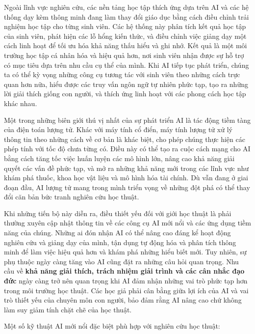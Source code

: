 Ngoài lĩnh vực nghiên cứu, các nền tảng học tập thích ứng dựa trên AI và các hệ thống dạy kèm thông minh đang làm thay đổi giáo dục bằng cách điều chỉnh trải nghiệm học tập cho từng sinh viên. Các hệ thống này phân tích kết quả học tập của sinh viên, phát hiện các lỗ hổng kiến thức, và điều chỉnh việc giảng dạy một cách linh hoạt để tối ưu hóa khả năng thấu hiểu và ghi nhớ. Kết quả là một môi trường học tập cá nhân hóa và hiệu quả hơn, nơi sinh viên nhận được sự hỗ trợ có mục tiêu dựa trên nhu cầu cụ thể của mình. Khi AI tiếp tục phát triển, chúng ta có thể kỳ vọng những công cụ tương tác với sinh viên theo những cách trực quan hơn nữa, hiểu được các truy vấn ngôn ngữ tự nhiên phức tạp, tạo ra những lời giải thích giống con người, và thích ứng linh hoạt với các phong cách học tập khác nhau.

Một trong những biên giới thú vị nhất của sự phát triển AI là tác động tiềm tàng của điện toán lượng tử. Khác với máy tính cổ điển, máy tính lượng tử xử lý thông tin theo những cách về cơ bản là khác biệt, cho phép chúng thực hiện các phép tính với tốc độ chưa từng có. Điều này có thể tạo ra cuộc cách mạng cho AI bằng cách tăng tốc việc huấn luyện các mô hình lớn, nâng cao khả năng giải quyết các vấn đề phức tạp, và mở ra những khả năng mới trong các lĩnh vực như khám phá thuốc, khoa học vật liệu và mô hình hóa tài chính. Dù vẫn đang ở giai đoạn đầu, AI lượng tử mang trong mình triển vọng về những đột phá có thể thay đổi căn bản bức tranh nghiên cứu học thuật.

Khi những tiến bộ này diễn ra, điều thiết yếu đối với giới học thuật là phải thường xuyên cập nhật thông tin về các công cụ AI mới nổi và các ứng dụng tiềm năng của chúng. Những ai đón nhận AI có thể nâng cao đáng kể hoạt động nghiên cứu và giảng dạy của mình, tận dụng tự động hóa và phân tích thông minh để làm việc hiệu quả hơn và khám phá những hiểu biết mới. Tuy nhiên, sự phụ thuộc ngày càng tăng vào AI cũng đặt ra những câu hỏi quan trọng. Nhu cầu về \textbf{khả năng giải thích, trách nhiệm giải trình và các cân nhắc đạo đức} ngày càng trở nên quan trọng khi AI đảm nhận những vai trò phức tạp hơn trong môi trường học thuật. Các học giả phải cân bằng giữa lợi ích của AI và vai trò thiết yếu của chuyên môn con người, bảo đảm rằng AI nâng cao chứ không làm suy giảm tính chặt chẽ của học thuật.

Một số kỹ thuật AI mới nổi đặc biệt phù hợp với nghiên cứu học thuật:


